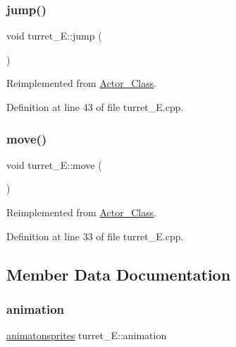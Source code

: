 \subsubsection{\texorpdfstring{jump()}{jump()}}
{\footnotesize\ttfamily void turret\+\_\+\+E\+::jump (\begin{DoxyParamCaption}{ }\end{DoxyParamCaption})\hspace{0.3cm}{\ttfamily [virtual]}}



Reimplemented from \hyperlink{class_actor___class_ab33216a3ce0c856bdc16231c71ae35c2}{Actor\+\_\+\+Class}.



Definition at line 43 of file turret\+\_\+\+E.\+cpp.

\hypertarget{classturret___e_a126e7a9b7731b83d5cdb3661807370bb}{}\label{classturret___e_a126e7a9b7731b83d5cdb3661807370bb} 
\subsubsection{\texorpdfstring{move()}{move()}}
{\footnotesize\ttfamily void turret\+\_\+\+E\+::move (\begin{DoxyParamCaption}{ }\end{DoxyParamCaption})\hspace{0.3cm}{\ttfamily [virtual]}}



Reimplemented from \hyperlink{class_actor___class_af1764a94c5410ba8476f56553cd2c327}{Actor\+\_\+\+Class}.



Definition at line 33 of file turret\+\_\+\+E.\+cpp.



\subsection{Member Data Documentation}
\hypertarget{classturret___e_ad2b54ad13e3b615df89345329455c12f}{}\label{classturret___e_ad2b54ad13e3b615df89345329455c12f} 
\subsubsection{\texorpdfstring{animation}{animation}}
{\footnotesize\ttfamily \hyperlink{classanimatonsprites}{animatonsprites} turret\+\_\+\+E\+::animation}



